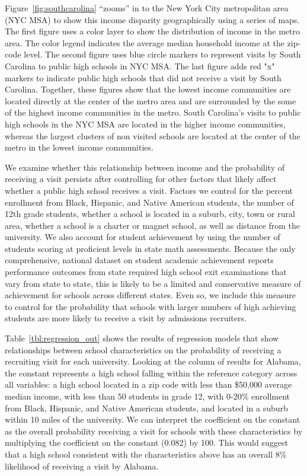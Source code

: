 \documentclass[twoside]{article}
\begin{document}
Figure~\ref{fig:southcarolina} “zooms” in to the New York City metropolitan area (NYC MSA) to show this income disparity geographically using a series of maps. The first figure uses a color layer to show the distribution of income in the metro area. The color legend indicates the average median household income at the zip-code level. The second figure uses blue circle markers to represent visits by South Carolina to public high schools in NYC MSA. The last figure adds red "x" markers to indicate public high schools that did not receive a visit by South Carolina. Together, these figures show that the lowest income communities are located directly at the center of the metro area and are surrounded by the some of the highest income communities in the metro. South Carolina's visits to public high schools in the NYC MSA are located in the higher income communities, whereas the largest clusters of non visited schools are located at the center of the metro in the lowest income communities.


We examine whether this relationship between income and the probability of receiving a visit persists after controlling for other factors that likely affect whether a public high school receives a visit. Factors we control for the percent enrollment from Black, Hispanic, and Native American students, the number of 12th grade students, whether a school is located in a suburb, city, town or rural area, whether a school is a charter or magnet school, as well as distance from the university. We also account for student achievement by using the number of students scoring at proficient levels in state math assessments. Because the only comprehensive, national dataset on student academic achievement reports performance outcomes from state required high school exit examinations that vary from state to state, this is likely to be a limited and conservative measure of achievement for schools across different states. Even so, we include this measure to control for the probability that schools with larger numbers of high achieving students are more likely to receive a visit by admissions recruiters. 

Table~\ref{tbl:regression_out} shows the results of regression models that show relationships between school characteristics on the probability of receiving a recruiting visit for each university. Looking at the column of results for Alabama, the constant represents a high school falling within the reference category across all variables: a high school located in a zip code with less than \$50,000 average median income, with less than 50 students in grade 12, with 0-20\% enrollment from Black, Hispanic, and Native American students, and located in a suburb within 10 miles of the university.  We can interpret the coefficient on the constant as the overall probability receiving a visit for schools with these characteristics by multiplying the coefficient on the constant (0.082) by 100. This would suggest that a high school consistent with the characteristics above has an overall 8\% likelihood of receiving a visit by Alabama.
\end{document}
